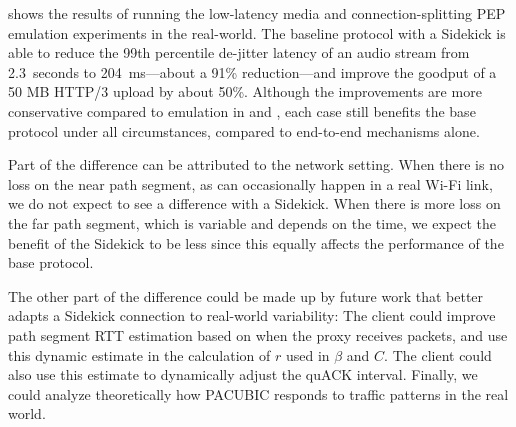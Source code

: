  shows the results of running the low-latency media and
connection-splitting PEP emulation experiments in the real-world. The baseline
protocol with a Sidekick is able to
reduce the 99th percentile de-jitter latency of an audio stream
from 2.3~seconds to 204~ms---about a 91\% reduction---and
improve the goodput of a 50 MB HTTP/3 upload by about 50\%.
Although the improvements are more conservative compared to emulation in
 and , each case still benefits the
base protocol under all circumstances, compared to end-to-end mechanisms alone.

Part of the difference can be attributed to the network setting. When there is
no loss on the near path segment, as can occasionally happen in a real Wi-Fi link,
we do not expect to
see a difference with a Sidekick. When there is more loss on the far path segment, which
is variable and depends on the time, we
expect the benefit of the Sidekick to be less since this equally affects the
performance of the base protocol.

The other part of the difference could be made up by future work that better
adapts a Sidekick connection to real-world variability: The client could improve
path segment RTT estimation based on when the proxy receives packets, and use this
dynamic estimate in the calculation of $r$ used in $\beta$ and $C$.
The client could also use
this estimate to dynamically adjust the quACK interval.
Finally, we could analyze theoretically how PACUBIC responds
to traffic patterns in the real world.
